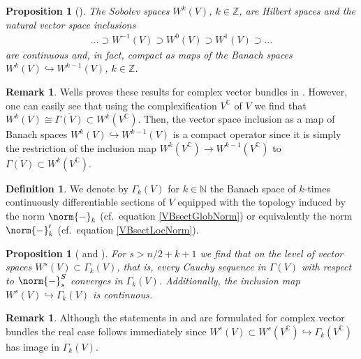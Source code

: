 \documentclass[12pt,a4paper]{article}
\theoremstyle{plain}
\newtheorem{proposition}[theorem]{Proposition}
\theoremstyle{definition}
\newtheorem{definition}[theorem]{Definition}
\newtheorem{remark}[theorem]{Remark}
\newcommand{\N}{\mathbb{N}}
\newcommand{\nnorm}[2]{\norm{#1}_{#2}}
\begin{document}
\begin{proposition}[{\cite[§4, p.~110 and §4 Proposition 1.2]{Wells07}}]
\label{Prop:Rellich}
The Sobolev spaces $W^k(V)$, $k\in \mathbb Z$, are Hilbert spaces and the natural vector space inclusions
\begin{align*}
    \ldots\supset W^{-1}(V)\supset W^0(V) \supset W^1 (V)\supset\ldots
\end{align*}
are continuous and, in fact, compact as maps of the Banach spaces $W^k(V)\hookrightarrow W^{k-1}(V)$, $k\in\mathbb Z$. 
\end{proposition}

\begin{remark}
Wells proves these results for complex vector bundles in \cite[§4, Proposition 1.2]{Wells07}. However, one can easily see that using the complexification $V^{\mathbb C}$ of $V$ we find that $W^k(V)\cong \overline{\Gamma(V)}\subset W^k(V^\mathbb C)$. Then, the vector space inclusion as a map of Banach spaces $W^k(V)\hookrightarrow W^{k-1}(V)$ is a compact operator since it is simply the restriction of the inclusion map $W^k(V^\mathbb{C})\to W^{k-1}(V^\mathbb C)$ to $\overline{\Gamma(V)}\subset W^k(V^{\mathbb C})$. 
\end{remark}



\begin{definition}
We denote by $\Gamma_k(V)$ for $k\in \N$ the Banach space of $k$-times continuously differentiable sections of $V$ equipped with the topology induced by the norm $\nnorm{-}{k}$ (cf.~equation \eqref{VBsectGlobNorm}) or equivalently the norm $\nnorm{-}{k}'$ (cf.~equation \eqref{VBsectLocNorm}). 
\end{definition}


\begin{proposition}[{\cite[§4, Proposition 1.1]{Wells07} and \cite[Chapter X, §4, Theorem 4]{IndexTheorem}}]
\label{Prop:SobolevEmbThm}
For $s>n/2+k+1$ we find that on the level of vector spaces $W^s(V)\subset \Gamma_k(V)$, that is, every Cauchy sequence in $\Gamma(V)$ with respect to $\nnorm{-}{s}^S$ converges in $\Gamma_k(V)$. Additionally, the inclusion map $W^s(V)\hookrightarrow \Gamma_k(V)$ is continuous.
\end{proposition}

\begin{remark}
Although the statements in \cite[§4, Proposition 1.1]{Wells07} and \cite[Chapter X, §4, Theorem 4]{IndexTheorem} are formulated for complex vector bundles the real case follows immediately since
$W^s(V)\subset W^s(V^{\mathbb C})\hookrightarrow \Gamma_k(V^{\mathbb C})$ has image in $\Gamma_k(V)$.
\end{remark}
    
\end{document}
